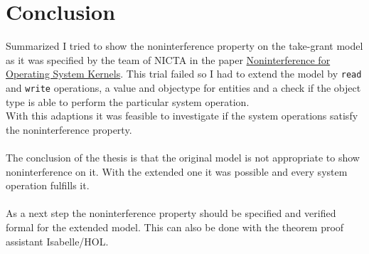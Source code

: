 \section{Conclusion}
Summarized I tried to show the noninterference property on the take-grant model as it was specified by the team of NICTA in the paper \href{http://www.ssrg.nicta.com/publications/nicta_full_text/6004.pdf}{%
		Noninterference for Operating System Kernels}. This trial failed so I had to extend the model by \texttt{read} and \texttt{write} operations, a value and objectype for entities and a check if the object type is able to perform the particular system operation. \\
		With this adaptions it was feasible to investigate if the system operations satisfy the noninterference property. \\ \\
		The conclusion of the thesis is that the original model is not appropriate to show noninterference on it. With the extended one it was possible and every system operation fulfills it. \\ \\
		As a next step the noninterference property should be specified and verified formal for the extended model. This can also be done with the theorem proof assistant Isabelle/HOL.  